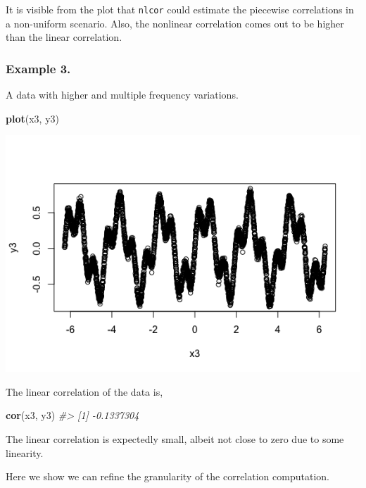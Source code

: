 \documentclass[]{article}
\newenvironment{Shaded}{\begin{snugshade}}{\end{snugshade}}
\newcommand{\CommentTok}[1]{\textcolor[rgb]{0.56,0.35,0.01}{\textit{#1}}}
\newcommand{\KeywordTok}[1]{\textcolor[rgb]{0.13,0.29,0.53}{\textbf{#1}}}
\newcommand{\NormalTok}[1]{#1}
\begin{document}
It is visible from the plot that \texttt{nlcor} could estimate the
piecewise correlations in a non-uniform scenario. Also, the nonlinear
correlation comes out to be higher than the linear correlation.

\hypertarget{example-3.}{%
\subsubsection{Example 3.}\label{example-3.}}

A data with higher and multiple frequency variations.

\begin{Shaded}
\begin{Highlighting}[]
\KeywordTok{plot}\NormalTok{(x3, y3)}
\end{Highlighting}
\end{Shaded}

\begin{center}\includegraphics{README_files/figure-markdown_strict/Figure-3.1-1} \end{center}

The linear correlation of the data is,

\begin{Shaded}
\begin{Highlighting}[]
\KeywordTok{cor}\NormalTok{(x3, y3)}
\CommentTok{#> [1] -0.1337304}
\end{Highlighting}
\end{Shaded}

The linear correlation is expectedly small, albeit not close to zero due
to some linearity.

Here we show we can refine the granularity of the correlation
computation.
\end{document}
